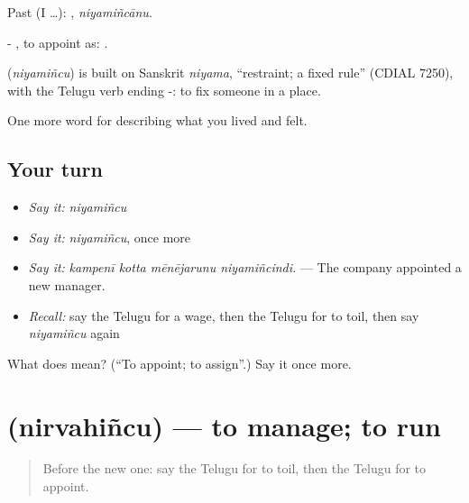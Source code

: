 Past (I …): , \emph{niyamiñcānu}.

- , to appoint as:   .

\begin{cousinweb}
\textbf{} (\emph{niyamiñcu}) is built on Sanskrit \emph{niyama}, \textquotedblleft{}restraint; a fixed rule\textquotedblright{} (CDIAL 7250), with the Telugu verb ending -: to fix someone in a place.
\end{cousinweb}

\begin{grammarlens}[title={What you've built}]
One more word for describing what you lived and felt.
\end{grammarlens}

\subsection*{Your turn}
\begin{itemize}
\raggedright
  \item \emph{Say it:} \emph{niyamiñcu}
  \item \emph{Say it:} \emph{niyamiñcu}, once more
  \item \emph{Say it:} \emph{kampenī kotta mēnējarunu niyamiñcindi.} — The company appointed a new manager.
  \item \emph{Recall:} say the Telugu for a wage, then the Telugu for to toil, then say \emph{niyamiñcu} again
\end{itemize}

\begin{tcolorbox}[breakable,colback=teal!4,colframe=teal!35!black,title={Before you move on}]
What does  mean? (\textquotedblleft{}To appoint; to assign\textquotedblright{}.) Say it once more.
\end{tcolorbox}
\section[\texorpdfstring{\te{నిర్వహించు} (nirvahiñcu)}{నిర్వహించు (nirvahiñcu)}]{ (nirvahiñcu) — to manage; to run}

\label{lesson:TE-C526-nirvahincu}



\begin{quote}
Before the new one: say the Telugu for to toil, then the Telugu for to appoint.
\end{quote}

